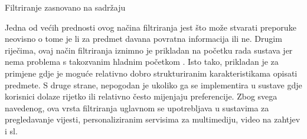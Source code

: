 \documentclass[times, utf8, diplomski, numeric]{fer}
\begin{document}
\begin{algorithm}[H]
	\caption{Filtriranje zasnovano na sadržaju}
	\label{algo:content}
	\begin{algorithmic}[1]
		
				\ENDIF
			\ENDFOR
			\ENDFOR
		\ENDFOR
		
				\ENDIF
			\ENDFOR
		\ENDFOR
		

			\ENDFOR
		\ENDFOR
		
	\end{algorithmic}
\end{algorithm}

Jedna od većih prednosti ovog načina filtriranja jest što može stvarati
preporuke neovisno o tome je li za predmet davana povratna informacija ili ne.
Drugim riječima, ovaj način filtriranja iznimno je prikladan na početku rada
sustava jer nema problema s takozvanim hladnim početkom .
Isto tako, prikladan je za primjene gdje je moguće relativno dobro strukturiranim
karakteristikama opisati predmete. S druge strane, nepogodan je ukoliko ga
se implementira u sustave gdje korisnici dolaze rijetko ili relativno često
mijenjaju preferencije. Zbog svega navedenog, ova vrsta filtriranja uglavnom se
upotrebljava u sustavima za pregledavanje vijesti, personaliziranim servisima za
multimediju, video na zahtjev i sl.
\end{document}
